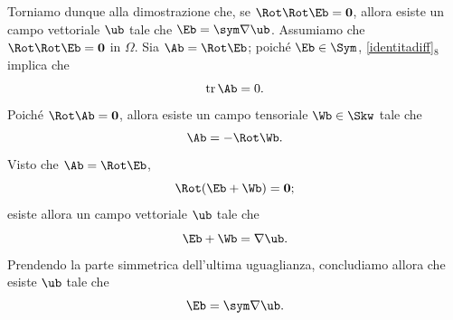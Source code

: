 Torniamo dunque alla dimostrazione che, se $\Rot \Rot \Eb=\mathbf{0}$, allora  esiste un campo vettoriale $\ub$ tale che $\Eb =\sym \nabla \ub$. Assumiamo che $\Rot\Rot\Eb=\mathbf{0}$ in $\Omega$.  Sia $\Ab =\Rot \Eb$; poiché $\Eb \in \Sym$, 
\eqref{identitadiff}$_8$ implica che
\begin{equation}
\operatorname{tr}\Ab=0.
\end{equation}
Poiché $\Rot \Ab=\mathbf{0}$, allora esiste un campo tensoriale $\Wb\in\Skw$ tale che
\begin{equation}
	\Ab =-\Rot \Wb.
\end{equation}
Visto che $\Ab =\Rot \Eb$,
\begin{equation}
\Rot (\Eb+ \Wb)=\mathbf{0};
\end{equation}
esiste allora un campo vettoriale $\ub$ tale che
\begin{equation}
	\Eb+ \Wb= \nabla \ub.
\end{equation}
Prendendo la parte simmetrica dell'ultima uguaglianza, concludiamo allora che esiste $\ub$ tale che
\begin{equation}
\Eb = \sym \nabla \ub.
\end{equation}









